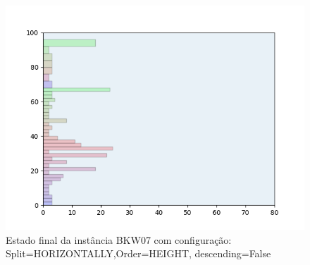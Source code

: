 \begin{figure}[H]
    \centering
    \caption[]{Estado final da instância BKW07 com configuração: Split=HORIZONTALLY,Order=HEIGHT, descending=False}
    \label{fig:bkw07-horizontally-height-false}
    \includegraphics[scale=0.5]{output/figures/bkw/bkw07/horizontally/height/false/00}
\end{figure}